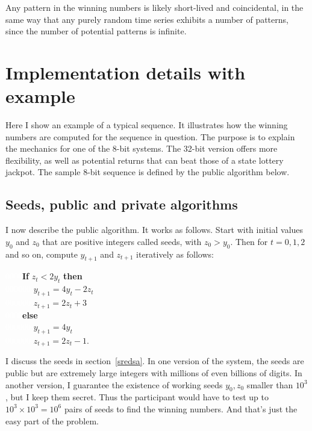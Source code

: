 \documentclass[oneside,10pt]{book}
\begin{document}
\noindent Any pattern in the winning numbers is likely short-lived and coincidental, in the same way that any purely random 
 time series exhibits a number of patterns, since the number of potential patterns is infinite.

\section{Implementation details with example}

Here I show an example of a typical sequence. It illustrates how the winning numbers are computed for the sequence in question. The purpose is to explain the mechanics for one of the 8-bit systems. The 32-bit version offers more flexibility, as well as potential returns that can beat those of a state lottery jackpot. The sample 8-bit sequence is defined by the public algorithm below.


\subsection{Seeds, public and private algorithms}\label{porcinired}

I now describe the public algorithm. It works as follows. Start with initial values $y_0$ and $z_0$ that are positive integers 
called \textcolor{index}{seeds}, with $z_0>y_0$. Then for $t = 0, 1, 2$ and so on, compute $y_{t+1}$ and $z_{t+1}$ iteratively as follows:\vspace{1ex}

\noindent  \textcolor{white}{0000}{\bf If}  $ z_t  <2y_t$   {\bf then}   \\
  \textcolor{white}{000000}  $y_{t+1}=4y_t-2z_t$\\
 \textcolor{white}{000000} $z_{t+1}=2z_t+3$\\
\textcolor{white}{0000}{\bf else} \\  
\textcolor{white}{000000} $ y_{t+1}=4y_t$\\
\textcolor{white}{000000} $ z_{t+1}=2z_t-1.$
\vspace{1ex}

\noindent I discuss the seeds in section~\ref{sredsa}. In one version of the system, the seeds are public but are extremely large integers with millions of even billions of digits. In another version, I guarantee the existence of working seeds $y_0, z_0$ smaller than $10^3$, but I keep them secret. Thus the participant would have to test up to $10^3 \times 10^3 = 10^6$ pairs of seeds to find the winning numbers. And that's just the easy part of the problem.
\end{document}
